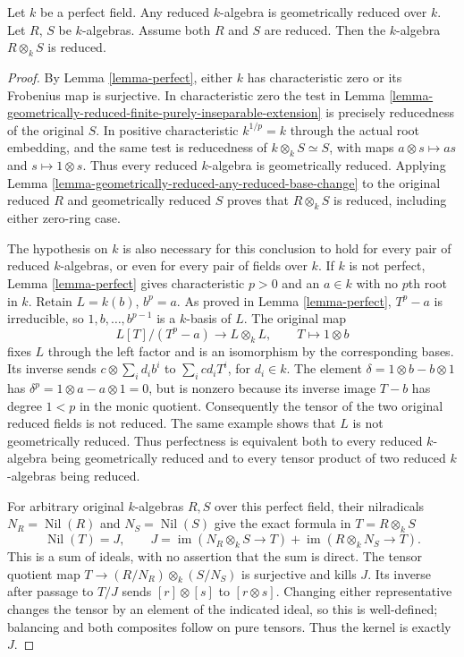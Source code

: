 \begin{lemma}
\label{lemma-perfect-reduced}
Let $k$ be a perfect field.
Any reduced $k$-algebra is geometrically reduced over $k$.
Let $R$, $S$ be $k$-algebras.
Assume both $R$ and $S$ are reduced.
Then the $k$-algebra $R \otimes_k S$ is reduced.
\end{lemma}

\begin{proof}
By Lemma \ref{lemma-perfect}, either $k$ has
characteristic zero or its Frobenius map is
surjective. In characteristic zero the test
in Lemma
\ref{lemma-geometrically-reduced-finite-purely-inseparable-extension}
is precisely reducedness of the original $S$.
In positive characteristic $k^{1/p}=k$ through
the actual root embedding, and the same test
is reducedness of $k\otimes_k S\simeq S$,
with maps $a\otimes s\mapsto as$ and
$s\mapsto1\otimes s$. Thus every reduced
$k$-algebra is geometrically reduced. Applying
Lemma \ref{lemma-geometrically-reduced-any-reduced-base-change}
to the original reduced $R$ and geometrically
reduced $S$ proves that $R\otimes_k S$ is
reduced, including either zero-ring case.

The hypothesis on $k$ is also necessary for
this conclusion to hold for every pair of
reduced $k$-algebras, or even for every pair
of fields over $k$. If $k$ is not perfect,
Lemma \ref{lemma-perfect} gives characteristic
$p>0$ and an $a\in k$ with no $p$th root in
$k$. Retain $L=k(b)$, $b^p=a$. As proved in
Lemma \ref{lemma-perfect}, $T^p-a$ is
irreducible, so $1,b,\ldots,b^{p-1}$ is a
$k$-basis of $L$. The original map
$$
L[T]/(T^p-a)\longrightarrow L\otimes_k L,
\qquad T\longmapsto1\otimes b
$$
fixes $L$ through the left factor and is an
isomorphism by the corresponding bases.
Its inverse sends $c\otimes\sum_i d_i b^i$
to $\sum_i cd_i T^i$, for $d_i\in k$.
The element $\delta=1\otimes b-b\otimes1$
has $\delta^p=1\otimes a-a\otimes1=0$,
but is nonzero because its inverse image
$T-b$ has degree $1<p$ in the monic
quotient. Consequently the tensor of the
two original reduced fields is not reduced.
The same example shows that $L$ is not
geometrically reduced. Thus perfectness is
equivalent both to every reduced $k$-algebra
being geometrically reduced and to every
tensor product of two reduced $k$-algebras
being reduced.

For arbitrary original $k$-algebras $R,S$
over this perfect field, their nilradicals
$N_R=\operatorname{Nil}(R)$ and
$N_S=\operatorname{Nil}(S)$ give the exact
formula in $T=R\otimes_k S$
$$
\operatorname{Nil}(T)=J,
\qquad
J=\operatorname{im}(N_R\otimes_k S\to T)
+\operatorname{im}(R\otimes_k N_S\to T).
$$
This is a sum of ideals, with no assertion
that the sum is direct. The tensor quotient
map $T\to (R/N_R)\otimes_k(S/N_S)$ is
surjective and kills $J$. Its inverse
after passage to $T/J$ sends
$[r]\otimes[s]$ to $[r\otimes s]$.
Changing either representative changes
the tensor by an element of the indicated
ideal, so this is well-defined; balancing
and both composites follow on pure tensors.
Thus the kernel is exactly $J$.


\end{proof}
